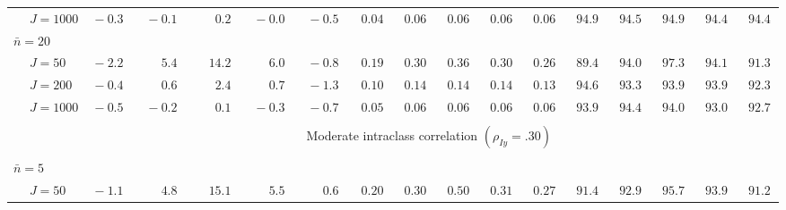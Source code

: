 \begin{sidewaystable}
\begin{threeparttable}
\begin{tabular}{llccccccccccccccc}
 & \nopagebreak $\;J=1000$  & $\phantom{0}{-}0.3\phantom{0}$ & $\phantom{0}{-}0.1\phantom{0}$ & $\phantom{0}\phantom{-}0.2\phantom{0}$ & $\phantom{0}{-}0.0\phantom{0}$ & $\phantom{0}{-}0.5\phantom{0}$ & $\phantom{0}0.04\phantom{0}$ & $\phantom{0}0.06\phantom{0}$ & $\phantom{0}0.06\phantom{0}$ & $\phantom{0}0.06\phantom{0}$ & $\phantom{0}0.06\phantom{0}$ & $\phantom{0}94.9\phantom{0}$ & $\phantom{0}94.5\phantom{0}$ & $\phantom{0}94.9\phantom{0}$ & $\phantom{0}94.4\phantom{0}$ & $\phantom{0}94.4\phantom{0}$ \\
\multicolumn{4}{l}{$\bar{n}=20$} \\  & \nopagebreak $\;J=50$  & $\phantom{0}{-}2.2\phantom{0}$ & $\phantom{0}\phantom{-}5.4\phantom{0}$ & $\phantom{-}14.2\phantom{0}$ & $\phantom{0}\phantom{-}6.0\phantom{0}$ & $\phantom{0}{-}0.8\phantom{0}$ & $\phantom{0}0.19\phantom{0}$ & $\phantom{0}0.30\phantom{0}$ & $\phantom{0}0.36\phantom{0}$ & $\phantom{0}0.30\phantom{0}$ & $\phantom{0}0.26\phantom{0}$ & $\phantom{0}89.4\phantom{0}$ & $\phantom{0}94.0\phantom{0}$ & $\phantom{0}97.3\phantom{0}$ & $\phantom{0}94.1\phantom{0}$ & $\phantom{0}91.3\phantom{0}$ \\
 & \nopagebreak $\;J=200$  & $\phantom{0}{-}0.4\phantom{0}$ & $\phantom{0}\phantom{-}0.6\phantom{0}$ & $\phantom{0}\phantom{-}2.4\phantom{0}$ & $\phantom{0}\phantom{-}0.7\phantom{0}$ & $\phantom{0}{-}1.3\phantom{0}$ & $\phantom{0}0.10\phantom{0}$ & $\phantom{0}0.14\phantom{0}$ & $\phantom{0}0.14\phantom{0}$ & $\phantom{0}0.14\phantom{0}$ & $\phantom{0}0.13\phantom{0}$ & $\phantom{0}94.6\phantom{0}$ & $\phantom{0}93.3\phantom{0}$ & $\phantom{0}93.9\phantom{0}$ & $\phantom{0}93.9\phantom{0}$ & $\phantom{0}92.3\phantom{0}$ \\
 & \nopagebreak $\;J=1000$  & $\phantom{0}{-}0.5\phantom{0}$ & $\phantom{0}{-}0.2\phantom{0}$ & $\phantom{0}\phantom{-}0.1\phantom{0}$ & $\phantom{0}{-}0.3\phantom{0}$ & $\phantom{0}{-}0.7\phantom{0}$ & $\phantom{0}0.05\phantom{0}$ & $\phantom{0}0.06\phantom{0}$ & $\phantom{0}0.06\phantom{0}$ & $\phantom{0}0.06\phantom{0}$ & $\phantom{0}0.06\phantom{0}$ & $\phantom{0}93.9\phantom{0}$ & $\phantom{0}94.4\phantom{0}$ & $\phantom{0}94.0\phantom{0}$ & $\phantom{0}93.0\phantom{0}$ & $\phantom{0}92.7\phantom{0}$ \\
[0.5ex]\hline\\[-1.6ex] 
& & \multicolumn{15}{c}{Moderate intraclass correlation $(\rho_{Iy}=.30)$} \\[0.6ex]\hline\\[-1.8ex]
\multicolumn{4}{l}{$\bar{n}=5$} \\  & \nopagebreak $\;J=50$  & $\phantom{0}{-}1.1\phantom{0}$ & $\phantom{0}\phantom{-}4.8\phantom{0}$ & $\phantom{-}15.1\phantom{0}$ & $\phantom{0}\phantom{-}5.5\phantom{0}$ & $\phantom{0}\phantom{-}0.6\phantom{0}$ & $\phantom{0}0.20\phantom{0}$ & $\phantom{0}0.30\phantom{0}$ & $\phantom{0}0.50\phantom{0}$ & $\phantom{0}0.31\phantom{0}$ & $\phantom{0}0.27\phantom{0}$ & $\phantom{0}91.4\phantom{0}$ & $\phantom{0}92.9\phantom{0}$ & $\phantom{0}95.7\phantom{0}$ & $\phantom{0}93.9\phantom{0}$ & $\phantom{0}91.2\phantom{0}$ \\

\end{tabular}
\end{threeparttable}
\end{sidewaystable}
